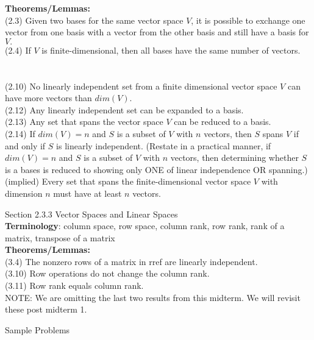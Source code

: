 \documentclass[11pt,fleqn]{article}
\begin{document}
\textbf{Theorems/Lemmas:}\\
(2.3) Given two bases for the same vector space $V$, it is possible to exchange one vector from one basis with a vector from the other basis and still have a basis for $V.$\\
(2.4) If $V$ is finite-dimensional, then all bases have the same number of vectors.\\\\\\
(2.10) No linearly independent set from a finite dimensional vector space $V$ can have more vectors than $dim(V).$\\
(2.12) Any linearly independent set can be expanded to a basis.\\
(2.13) Any set that spans the vector space $V$ can be reduced to a basis.\\
(2.14) If $dim(V)=n$ and $S$ is a subset of $V$ with $n$ vectors, then $S$ spans $V$ if and only if $S$ is linearly independent. (Restate in a practical manner, if  $dim(V)=n$ and $S$ is a subset of $V$ with $n$ vectors, then determining whether $S$ is a bases is reduced to showing only ONE of linear independence OR spanning.)\\
(implied) Every set that spans the finite-dimensional vector space $V$ with dimension $n$ must have at least $n$ vectors.

\noindent Section 2.3.3 Vector Spaces and Linear Spaces\\

\textbf{Terminology}: column space, row space, column rank, row rank, rank of a matrix, transpose of a matrix\\

\textbf{Theorems/Lemmas:}\\
(3.4) The nonzero rows of a matrix in rref are linearly independent.\\
(3.10) Row operations do not change the column rank.\\
(3.11) Row rank equals column rank.\\
NOTE: We are omitting the last two results from this midterm. We will revisit these post midterm 1.\\

\newpage
\begin{center} Sample Problems \end{center}
\end{document}
